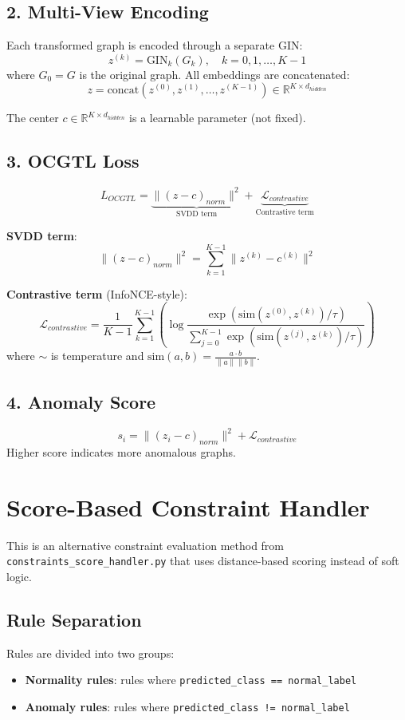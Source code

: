 \subsection{2. Multi-View Encoding}
Each transformed graph is encoded through a separate GIN:
\[
z^{(k)} = \text{GIN}_k(G_k), \quad k = 0, 1, \dots, K-1
\]
where $G_0 = G$ is the original graph. All embeddings are concatenated:
\[
z = \text{concat}(z^{(0)}, z^{(1)}, \dots, z^{(K-1)}) \in \mathbb{R}^{K \times d_{hidden}}
\]

The center $c \in \mathbb{R}^{K \times d_{hidden}}$ is a learnable parameter (not fixed).

\subsection{3. OCGTL Loss}
\[
L_{OCGTL} = \underbrace{\| (z - c)_{norm} \|^2}_{\text{SVDD term}} + \underbrace{\mathcal{L}_{contrastive}}_{\text{Contrastive term}}
\]

\textbf{SVDD term}:
\[
\| (z - c)_{norm} \|^2 = \sum_{k=1}^{K-1} \| z^{(k)} - c^{(k)} \|^2
\]

\textbf{Contrastive term} (InfoNCE-style):
\[
\mathcal{L}_{contrastive} = \frac{1}{K-1} \sum_{k=1}^{K-1} \left( \log \frac{\exp(\text{sim}(z^{(0)}, z^{(k)})/\tau)}{\sum_{j=0}^{K-1} \exp(\text{sim}(z^{(j)}, z^{(k)})/\tau)} \right)
\]
where $\sim$ is temperature and $\text{sim}(a,b) = \frac{a \cdot b}{\|a\|\|b\|}$.

\subsection{4. Anomaly Score}
\[
s_i = \| (z_i - c)_{norm} \|^2 + \mathcal{L}_{contrastive}
\]
Higher score indicates more anomalous graphs.


\section{Score-Based Constraint Handler}

This is an alternative constraint evaluation method from \texttt{constraints\_score\_handler.py} that uses distance-based scoring instead of soft logic.

\subsection{Rule Separation}
Rules are divided into two groups:
\begin{itemize}
    \item \textbf{Normality rules}: rules where \texttt{predicted\_class == normal\_label}
    \item \textbf{Anomaly rules}: rules where \texttt{predicted\_class != normal\_label}
\end{itemize}

